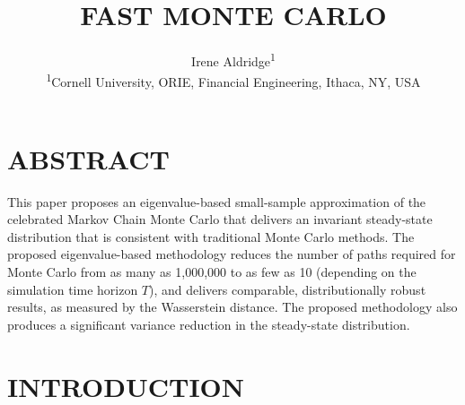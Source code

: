 \documentclass{wscpaperproc}
\theoremstyle{wsc}
\begin{document}
%
%

\title{FAST MONTE CARLO}

\author{\begin{center}Irene Aldridge\textsuperscript{1}\\
[11pt]
\textsuperscript{1}Cornell University, ORIE, Financial Engineering, Ithaca, NY, USA
\end{center}}


\maketitle

\vspace{-12pt}

\section*{ABSTRACT}
This paper proposes an eigenvalue-based small-sample approximation of the celebrated Markov Chain Monte Carlo that delivers an invariant steady-state distribution that is consistent with traditional Monte Carlo methods. The proposed eigenvalue-based methodology reduces the number of paths required for Monte Carlo from as many as 1,000,000 to as few as 10 (depending on the simulation time horizon $T$), and delivers comparable, distributionally robust results, as measured by the Wasserstein distance. The proposed methodology also produces a significant variance reduction in the steady-state distribution.


\section{INTRODUCTION}
\end{document}
